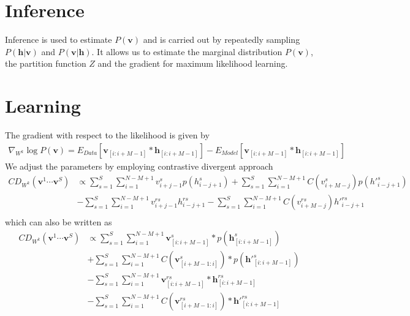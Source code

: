\documentclass[12pt]{article}
\begin{document}
\section{Inference}
Inference is used to estimate $P(\mathbf{v})$ and is carried out by repeatedly sampling
$P(\mathbf{h}|\mathbf{v})$ and $P(\mathbf{v}|\mathbf{h})$. It allows us to estimate the
marginal distribution $P(\mathbf{v})$, the partition function $Z$ and the gradient for 
maximum likelihood learning.
\section{Learning}
The gradient with respect to the likelihood is given by 
\begin{align}
	\nabla_{W^k} \log P(\mathbf{v}) = E_{Data}[\mathbf{v}_{[i:i+M-1]}* \mathbf{h}_{[i:i+M-1]}]-
	E_{Model}[\mathbf{v}_{[i:i+M-1]}* \mathbf{h}_{[i:i+M-1]}]
\end{align}
We adjust the parameters by employing contrastive divergent approach
\begin{align}
	CD_{W^k}(\mathbf{v}^1\cdots\mathbf{v}^S) &\propto 
	\sum_{s=1}^S \sum_{i=1}^{N-M+1} v_{i+j-1}^s p(h_{i-j+1}^s)+
	\sum_{s=1}^S \sum_{i=1}^{N-M+1} C(v_{i+M-j}^s) p({h'}_{i-j+1}^s)\nonumber\\
	&-\sum_{s=1}^S \sum_{i=1}^{N-M+1} v_{i+j-1}^{rs} h_{i-j+1}^{rs}
	-\sum_{s=1}^S \sum_{i=1}^{N-M+1} C(v_{i+M-j}^{rs}) {h'}_{i-j+1}^{rs}\nonumber\\
\end{align}
which can also be written as
\begin{align}
	CD_{W^k}(\mathbf{v}^1\cdots\mathbf{v}^S) &\propto
	\sum_{s=1}^S \sum_{i=1}^{N-M+1}\mathbf{v}_{[i:i+M-1]}^s* p(\mathbf{h}_{[i:i+M-1]}^s)\nonumber\\
	&+\sum_{s=1}^S \sum_{i=1}^{N-M+1}C(\mathbf{v}_{[i+M-1:i]}^s)* p(\mathbf{h'}_{[i:i+M-1]}^s)\nonumber\\
	&-\sum_{s=1}^S \sum_{i=1}^{N-M+1}\mathbf{v}_{[i:i+M-1]}^{rs}* \mathbf{h}_{[i:i+M-1]}^{rs}\nonumber\\
	&-\sum_{s=1}^S \sum_{i=1}^{N-M+1}C(\mathbf{v}_{[i+M-1:i]}^{rs})* \mathbf{h'}_{[i:i+M-1]}^{rs}\nonumber
\end{align}
\end{document}
